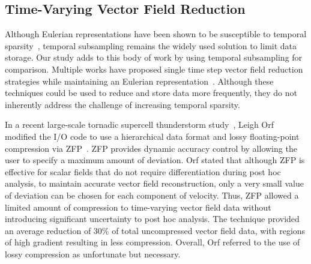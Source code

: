 \subsection{Time-Varying Vector Field Reduction}
%
%
%
%
Although Eulerian representations have been shown to be susceptible to temporal sparsity~\cite{costa2004lagrangian}\cite{Qin2014}\cite{agranovsky2014improved}\cite{sane2018revisiting}, temporal subsampling remains the widely used solution to limit data storage.
%
Our study adds to this body of work by using temporal subsampling for comparison.
%
Multiple works have proposed single time step vector field reduction strategies while maintaining an Eulerian representation~\cite{lodha2000topology}\cite{lodha2003topology}\cite{theisel2003combining}\cite{tong2012salient}.
%
%
%
%
%
Although these techniques could be used to reduce and store data more frequently, they do not inherently address the challenge of increasing temporal sparsity.
%

In a recent large-scale tornadic supercell thunderstorm study~\cite{atmos10100578}, Leigh Orf modified the I/O code to use a hierarchical data format and lossy floating-point compression via ZFP~\cite{lindstrom2006fast}.
%
ZFP provides dynamic accuracy control by allowing the user to specify a maximum amount of deviation.
%
Orf stated that although ZFP is effective for scalar fields that do not require differentiation during post hoc analysis, to maintain accurate vector field reconstruction, only a very small value of deviation can be chosen for each component of velocity.
%
Thus, ZFP allowed a limited amount of compression to time-varying vector field data without introducing significant uncertainty to post hoc analysis. 
%
The technique provided an average reduction of 30\% of total uncompressed vector field data, with regions of high gradient resulting in less compression. 
%
Overall, Orf referred to the use of lossy compression as unfortunate but necessary.

